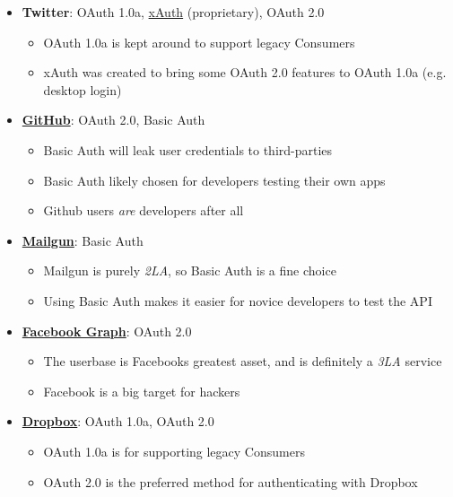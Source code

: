 \documentclass{book}
\begin{document}
\begin{itemize}
\item \textbf{Twitter}: OAuth 1.0a, \href{https://dev.twitter.com/docs/oauth/xauth}{xAuth} (proprietary), OAuth 2.0
    \begin{itemize}
        \item OAuth 1.0a is kept around to support legacy Consumers
        \item xAuth was created to bring some OAuth 2.0 features to OAuth 1.0a (e.g. desktop login)
    \end{itemize}
\item \href{http://developer.github.com/v3/#authentication}{\textbf{GitHub}}: OAuth 2.0, Basic Auth
    \begin{itemize}
        \item Basic Auth will leak user credentials to third-parties
        \item Basic Auth likely chosen for developers testing their own apps
        \item Github users \emph{are} developers after all
    \end{itemize}
\item \href{http://documentation.mailgun.com/quickstart.html#authentication}{\textbf{Mailgun}}: Basic Auth
    \begin{itemize}
        \item Mailgun is purely \emph{2LA}, so Basic Auth is a fine choice
        \item Using Basic Auth makes it easier for novice developers to test the API
    \end{itemize}
\item \href{https://developers.facebook.com/docs/reference/dialogs/oauth/}{\textbf{Facebook Graph}}: OAuth 2.0
    \begin{itemize}
        \item The userbase is Facebooks greatest asset, and is definitely a \emph{3LA} service
        \item Facebook is a big target for hackers
    \end{itemize}
\item \href{https://www.dropbox.com/developers/core/docs}{\textbf{Dropbox}}: OAuth 1.0a, OAuth 2.0
    \begin{itemize}
        \item OAuth 1.0a is for supporting legacy Consumers
        \item OAuth 2.0 is the preferred method for authenticating with Dropbox
    \end{itemize}
\end{itemize}
\end{document}
